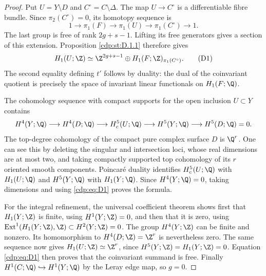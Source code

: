 \begin{proof}
Put $U=Y\setminus D$ and $C^\circ=C\setminus\Delta$.
The map $U\to C^\circ$ is a differentiable fibre bundle. Since
$\pi_2(C^\circ)=0$, its homotopy sequence is
\[
1\longrightarrow\pi_1(F)\longrightarrow\pi_1(U)
 \longrightarrow\pi_1(C^\circ)\longrightarrow1.
\]
The last group is free of rank $2g+s-1$. Lifting its free generators
gives a section of this extension. Proposition \ref{cdp:st:D.1.1} therefore gives
\[
H_1(U;\Z)\simeq
\Z^{2g+s-1}\oplus H_1(F;\Z)_{\pi_1(C^\circ)}.       \tag{D1}\label{cdp:eq:D1}
\]
The second equality defining $t'$ follows by duality: the dual of
the coinvariant quotient is precisely the space of invariant
linear functionals on $H_1(F;\Q)$.

The cohomology sequence with compact supports for the open inclusion
$U\subset Y$ contains
\[
H^4(Y;\Q)\longrightarrow H^4(D;\Q)
\longrightarrow H_c^5(U;\Q)
\longrightarrow H^5(Y;\Q)\longrightarrow H^5(D;\Q)=0.
\]
The top-degree cohomology of the compact pure complex surface $D$
is $\Q^r$. One can see this by deleting the singular and intersection
loci, whose real dimensions are at most two, and taking compactly
supported top cohomology of its $r$ oriented smooth components.
Poincar\'e duality identifies $H_c^5(U;\Q)$ with $H_1(U;\Q)$ and
$H^5(Y;\Q)$ with $H_1(Y;\Q)$. Since $H^4(Y;\Q)=0$, taking
dimensions and using \eqref{cdp:eq:D1} proves the formula.

For the integral refinement, the universal coefficient theorem shows
first that $H_1(Y;\Z)$ is finite, using $H^1(Y;\Z)=0$, and then that
it is zero, using
$\operatorname{Ext}^1(H_1(Y;\Z),\Z)\subset H^2(Y;\Z)=0$.
The group $H^4(Y;\Z)$ can be finite and nonzero. Its homomorphism
to $H^4(D;\Z)=\Z^r$ is nevertheless zero. The same sequence now
gives $H_1(U;\Z)\simeq\Z^r$, since $H^5(Y;\Z)=H_1(Y;\Z)=0$.
Equation \eqref{cdp:eq:D1} then proves that the coinvariant summand is free.
Finally $H^1(C;\Q)\hookrightarrow H^1(Y;\Q)$ by the Leray edge
map, so $g=0$.
\end{proof}



